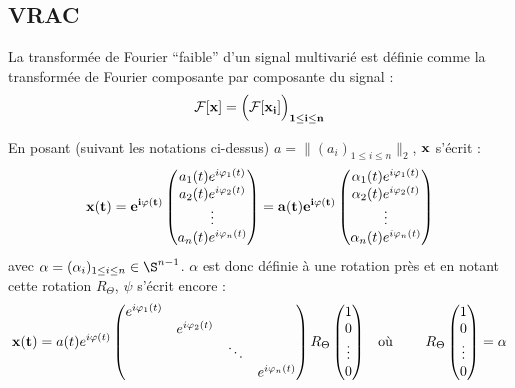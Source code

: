 \subsection{VRAC}

\begin{definition}
	La transformée de Fourier ``faible'' d'un signal multivarié est définie comme la transformée de Fourier composante par composante du signal :
	\[\mathcal{F}[\bf{x}] = \Big(\mathcal{F}[x_i]\Big)_{1\leq i\leq n}\]
\end{definition}


\begin{remarque}
	En posant (suivant les notations ci-dessus) $a = \big\|(a_i)_{1\leq i\leq n}\big\|_2$, $\bf{x}$ s'écrit :
	\[\bf{x}(t) = e^{i\varphi(t)}\begin{pmatrix} a_1(t)e^{i\varphi_1(t)} \\ a_2(t)e^{i\varphi_2(t)} \\ \vdots \\ a_n(t)e^{i\varphi_n(t)}
	\end{pmatrix} = a(t)e^{i\varphi(t)}\begin{pmatrix} \alpha_1(t)e^{i\varphi_1(t)} \\ \alpha_2(t)e^{i\varphi_2(t)} \\ \vdots \\ \alpha_n(t)e^{i\varphi_n(t)} \end{pmatrix}\]
	avec $\alpha = (\alpha_i)_{1\leq i\leq n} \in \S^{n-1}$. $\alpha$ est donc définie à une rotation près et en notant cette rotation $R_\Theta$, $\psi$ s'écrit encore :
	\begin{align*}
		\bf{x}(t) &= a(t)e^{i\varphi(t)}\begin{pmatrix} e^{i\varphi_1(t)} \\ & e^{i\varphi_2(t)} \\  & & \ddots \\ & & & e^{i\varphi_n(t)}\end{pmatrix} R_\Theta\begin{pmatrix} 1 \\ 0 \\ \vdots \\ 0 \end{pmatrix}   &  \text{où }\qquad R_\Theta\begin{pmatrix} 1 \\ 0 \\ \vdots \\ 0 \end{pmatrix} = \alpha\\

\end{align*}
\end{remarque}
